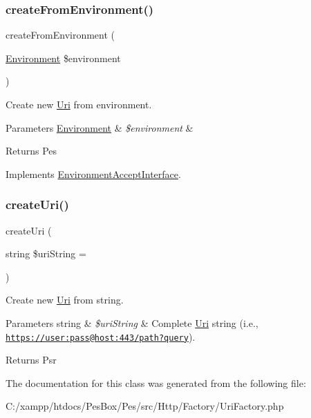 \subsubsection{\texorpdfstring{create\+From\+Environment()}{createFromEnvironment()}}
{\footnotesize\ttfamily create\+From\+Environment (\begin{DoxyParamCaption}\item[{\mbox{\hyperlink{class_pes_1_1_http_1_1_environment}{Environment}}}]{\$environment }\end{DoxyParamCaption})}

Create new \mbox{\hyperlink{class_pes_1_1_http_1_1_uri}{Uri}} from environment.


\begin{DoxyParams}[1]{Parameters}
\mbox{\hyperlink{class_pes_1_1_http_1_1_environment}{Environment}} & {\em \$environment} & \\
\hline
\end{DoxyParams}
\begin{DoxyReturn}{Returns}
Pes 
\end{DoxyReturn}


Implements \mbox{\hyperlink{interface_pes_1_1_http_1_1_factory_1_1_environment_accept_interface}{Environment\+Accept\+Interface}}.

\mbox{\label{class_pes_1_1_http_1_1_factory_1_1_uri_factory_a56bc76febb6104edfde8e766f5b644ee}} 
\subsubsection{\texorpdfstring{create\+Uri()}{createUri()}}
{\footnotesize\ttfamily create\+Uri (\begin{DoxyParamCaption}\item[{string}]{\$uri\+String = {\ttfamily \textquotesingle{}\textquotesingle{}} }\end{DoxyParamCaption})}

Create new \mbox{\hyperlink{class_pes_1_1_http_1_1_uri}{Uri}} from string.


\begin{DoxyParams}[1]{Parameters}
string & {\em \$uri\+String} & Complete \mbox{\hyperlink{class_pes_1_1_http_1_1_uri}{Uri}} string (i.\+e., \href{https://user:pass@host:443/path?query}{\tt https\+://user\+:pass@host\+:443/path?query}).\\
\hline
\end{DoxyParams}
\begin{DoxyReturn}{Returns}
Psr 
\end{DoxyReturn}


The documentation for this class was generated from the following file\+:\begin{DoxyCompactItemize}
\item 
C\+:/xampp/htdocs/\+Pes\+Box/\+Pes/src/\+Http/\+Factory/Uri\+Factory.\+php\end{DoxyCompactItemize}

